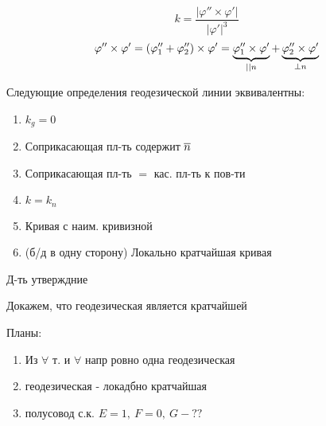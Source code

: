 \documentclass[main]{subfiles}
\begin{document}
    \begin{Proof}
        \[k = \frac{|\varphi'' \times \varphi'|}{|\varphi'|^3}\]
        \[\varphi'' \times \varphi' = (\varphi''_1 + \varphi''_2) \times \varphi' = \ub{||n}{\varphi''_1 \times \varphi'} + \ub{\bot n}{\varphi''_2 \times \varphi'}\]
    \end{Proof}

    \begin{utv}
        Следующие определения геодезической линии эквивалентны:
        \begin{enumerate}
          \item $k_g = 0$
          \item Соприкасающая пл-ть содержит $\ol{n}$
          \item Соприкасающая пл-ть $=$ кас. пл-ть к пов-ти
          \item $k = k_n$
          \item Кривая с наим. кривизной
          \item (б/д в одну сторону) Локально кратчайшая кривая
        \end{enumerate}
    \end{utv}

    \begin{upr}
        Д-ть утверждние

        Докажем, что геодезическая является кратчайшей
    \end{upr}

    Планы:
    \begin{enumerate}
      \item Из $\forall$ т. и $\forall$ напр ровно одна геодезическая
      \item геодезическая - локадбно кратчайшая
      \item полусовод с.к. $E=1,\ F = 0,\ G -??$
    \end{enumerate}
\end{document}
